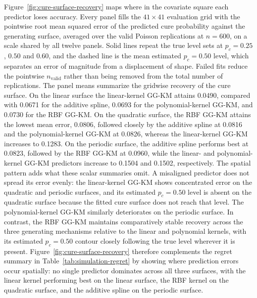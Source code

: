 Figure~\ref{fig:cure-surface-recovery} maps where in the
covariate square each predictor loses accuracy. Every panel
fills the $41\times41$ evaluation grid with the pointwise root
mean squared error of the predicted cure probability against
the generating surface, averaged over the valid Poisson
replications at $n=600$, on a scale shared by all twelve panels.
Solid lines repeat the true level sets at $p_c=0.25$, $0.50$
and $0.60$, and the dashed line is the mean estimated
$p_c=0.50$ level, which separates an error of magnitude from a
displacement of shape. Failed fits reduce the pointwise
$n_{\mathrm{valid}}$ rather than being removed from the total
number of replications. The panel means summarize the gridwise
recovery of the cure surface. On the linear surface the
linear-kernel GG-KM attains 0.0490, compared with 0.0671 for
the additive spline, 0.0693 for the polynomial-kernel GG-KM,
and 0.0730 for the RBF GG-KM. On the quadratic surface, the
RBF GG-KM attains the lowest mean error, 0.0806, followed
closely by the additive spline at 0.0816 and the
polynomial-kernel GG-KM at 0.0826, whereas the linear-kernel
GG-KM increases to 0.1283. On the periodic surface, the
additive spline performs best at 0.0823, followed by the RBF
GG-KM at 0.0960, while the linear- and polynomial-kernel GG-KM
predictors increase to 0.1504 and 0.1502, respectively. The
spatial pattern adds what these scalar summaries omit. A
misaligned predictor does not spread its error evenly: the
linear-kernel GG-KM shows concentrated error on the quadratic
and periodic surfaces, and its estimated $p_c=0.50$ level is
absent on the quadratic surface because the fitted cure surface
does not reach that level. The polynomial-kernel GG-KM
similarly deteriorates on the periodic surface. In contrast,
the RBF GG-KM maintains comparatively stable recovery across
the three generating mechanisms relative to the linear and
polynomial kernels, with its estimated $p_c=0.50$ contour
closely following the true level wherever it is present.
Figure~\ref{fig:cure-surface-recovery} therefore complements
the regret summary in Table~\ref{tab:simulation-regret} by
showing where prediction errors occur spatially: no single
predictor dominates across all three surfaces, with the
linear kernel performing best on the linear surface, the RBF
kernel on the quadratic surface, and the additive spline on
the periodic surface.

